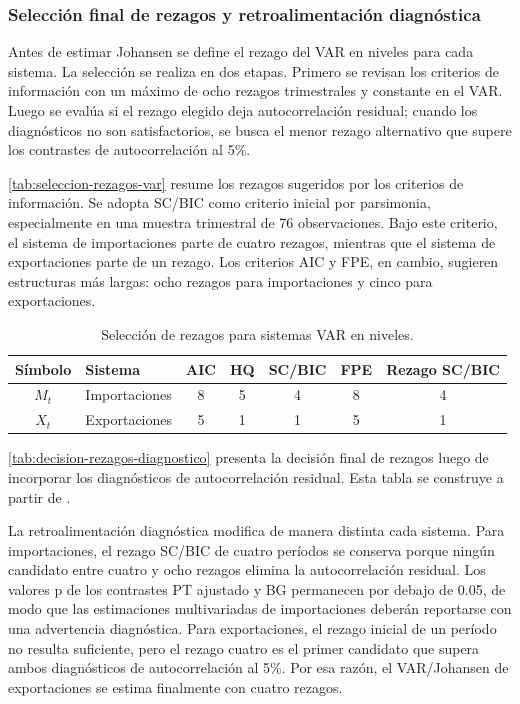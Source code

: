 \documentclass[11pt,a4paper]{article}
\begin{document}
	\subsubsection{Selección final de rezagos y retroalimentación diagnóstica}
	\label{subsubsec:seleccion-rezagos-diagnostico}
	
	Antes de estimar Johansen se define el rezago del VAR en niveles para cada
	sistema. La selección se realiza en dos etapas. Primero se revisan los criterios
	de información con un máximo de ocho rezagos trimestrales y constante en el
	VAR. Luego se evalúa si el rezago elegido deja autocorrelación residual; cuando
	los diagnósticos no son satisfactorios, se busca el menor rezago alternativo
	que supere los contrastes de autocorrelación al 5\%.
	
	\autoref{tab:seleccion-rezagos-var} resume los rezagos sugeridos por los
	criterios de información. Se adopta SC/BIC como criterio inicial por parsimonia,
	especialmente en una muestra trimestral de 76 observaciones. Bajo este criterio,
	el sistema de importaciones parte de cuatro rezagos, mientras que el sistema de
	exportaciones parte de un rezago. Los criterios AIC y FPE, en cambio, sugieren
	estructuras más largas: ocho rezagos para importaciones y cinco para
	exportaciones.
	
	\begin{table}[H]
		\centering
		\caption{Selección de rezagos para sistemas VAR en niveles.}
		\label{tab:seleccion-rezagos-var}
		\small
		\begin{tabular}{clccccc}
			\toprule
			Símbolo & Sistema & AIC & HQ & SC/BIC & FPE & Rezago SC/BIC \\
			\midrule
			\(M_t\) & Importaciones & 8 & 5 & 4 & 8 & 4 \\
			\(X_t\) & Exportaciones & 5 & 1 & 1 & 5 & 1 \\
			\bottomrule
		\end{tabular}
	\end{table}
	
	\autoref{tab:decision-rezagos-diagnostico} presenta la decisión final de
	rezagos luego de incorporar los diagnósticos de autocorrelación residual. Esta
	tabla se construye a partir de
	.
	
	La retroalimentación diagnóstica modifica de manera distinta cada sistema. Para
	importaciones, el rezago SC/BIC de cuatro períodos se conserva porque ningún
	candidato entre cuatro y ocho rezagos elimina la autocorrelación residual. Los
	valores p de los contrastes PT ajustado y BG permanecen por debajo de 0.05, de
	modo que las estimaciones multivariadas de importaciones deberán reportarse con
	una advertencia diagnóstica. Para exportaciones, el rezago inicial de un período
	no resulta suficiente, pero el rezago cuatro es el primer candidato que supera
	ambos diagnósticos de autocorrelación al 5\%. Por esa razón, el VAR/Johansen de
	exportaciones se estima finalmente con cuatro rezagos.
	
\end{document}
